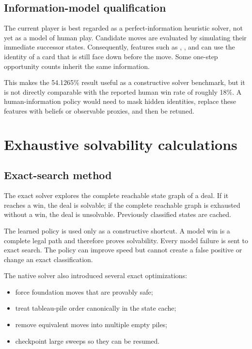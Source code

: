 \documentclass[11pt]{article}
\begin{document}
\endgroup

\subsection{Information-model qualification}

The current player is best regarded as a perfect-information heuristic solver, not yet as a model of human play. Candidate moves are evaluated by simulating their immediate successor states. Consequently, features such as \texttt{}, \texttt{}, and \texttt{} can use the identity of a card that is still face down before the move. Some one-step opportunity counts inherit the same information.

This makes the 54.1265\% result useful as a constructive solver benchmark, but it is not directly comparable with the reported human win rate of roughly 18\%. A human-information policy would need to mask hidden identities, replace these features with beliefs or observable proxies, and then be retuned.

\section{Exhaustive solvability calculations}

\subsection{Exact-search method}

The exact solver explores the complete reachable state graph of a deal. If it reaches a win, the deal is solvable; if the complete reachable graph is exhausted without a win, the deal is unsolvable. Previously classified states are cached.

The learned policy is used only as a constructive shortcut. A model win is a complete legal path and therefore proves solvability. Every model failure is sent to exact search. The policy can improve speed but cannot create a false positive or change an exact classification.

The native solver also introduced several exact optimizations:

\begin{itemize}
  \item force foundation moves that are provably safe;
  \item treat tableau-pile order canonically in the state cache;
  \item remove equivalent moves into multiple empty piles;
  \item checkpoint large sweeps so they can be resumed.
\end{itemize}
\end{document}
